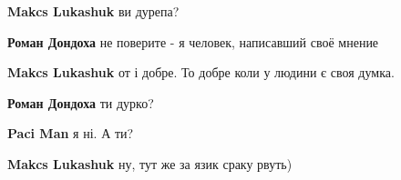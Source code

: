 \begin{itemize}
\begin{itemize}
 
\textbf{Makcs Lukashuk} ви дурепа?

 
\textbf{Роман Дондоха} не поверите - я человек, написавший своё мнение

 
\textbf{Makcs Lukashuk} от і добре. То добре коли у людини є своя думка.

 
\textbf{Роман Дондоха} ти дурко?

 
\textbf{Paci Man} я ні. А ти?

 
\textbf{Makcs Lukashuk} ну, тут же за язик сраку рвуть)

 

\end{itemize}
\end{itemize}
